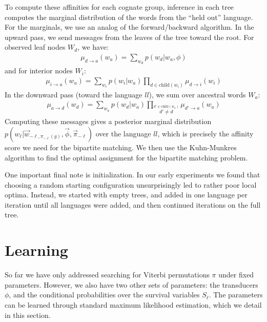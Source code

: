 \documentclass[11pt,a4paper]{article}
\begin{document}
To compute these affinities for each cognate group, inference in each
tree computes the marginal distribution of the words from the ``held
out'' language. For the marginals, we use an analog of the
forward/backward algorithm. In the upward pass, we send messages
from the leaves of the tree toward the root. For observed leaf nodes
$W_d$, we have:
\begin{equation}
  \begin{split}
    \mu_{d\to a}(w_a) = \sum_{w_d} p(w_d|w_a,\phi)
   \end{split}
 \end{equation}
and for interior nodes $W_i$:
\begin{equation}
  \label{eqn:summing}
  \begin{split}
    \mu_{i\to a}(w_a) = \sum_{w_i} p(w_i|w_a) \prod_{d \in \mathrm{child}(w_i)} \mu_{d \to i}(w_i) 
  \end{split}
\end{equation}
In the downward pass (toward the language $ll$), we sum over ancestral words $W_a$:
\begin{equation}
  \begin{split}
    \mu_{a\to d}(w_d) = \sum_{w_a} p(w_d|w_a) \prod_{\stackrel{d' \in \mathrm{child}(w_a)}{d' \neq d}} \mu_{d' \to a}(w_a) 
  \end{split}
\end{equation}
Computing these messages gives a posterior marginal distribution
$p(w_\ell|\vec w_{-\ell,\pi_{-\ell}(g)},\vec \phi,\vec\pi_{-\ell})$
over the language $ll$, which is precisely the affinity score
we need for the bipartite matching. We then use the Kuhn-Munkres
algorithm \cite{Kuhn1955} to find the optimal assignment for the
bipartite matching problem.

One important final note is initialization. In our early experiments
we found that choosing a random starting configuration unsurprisingly led
to rather poor local optima. Instead, we started with empty trees,
and added in one language per iteration until all languages were
added, and then continued iterations on the full tree.

\section{Learning}

So far we have only addressed searching for Viterbi permutations
$\pi$ under fixed parameters. However, we also have two other sets
of parameters: the transducers $\phi$, and the conditional probabilities
over the survival variables $S_\ell$. The parameters can be learned
through standard maximum likelihood estimation, which we detail in
this section.
\end{document}
